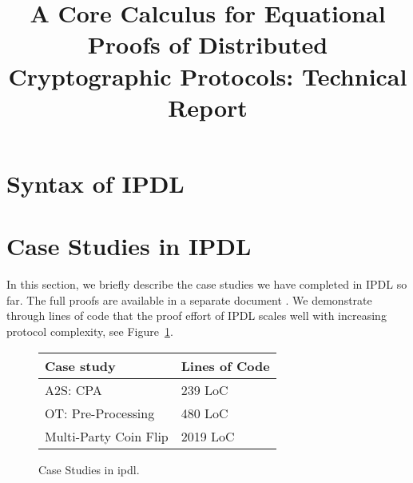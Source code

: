\documentclass[11pt,hidelinks]{article}
\newcommand{\ipdl}{\textsf{IPDL} }
\begin{document}
\title{A Core Calculus for Equational Proofs of Distributed Cryptographic Protocols: Technical Report}

\maketitle

\section{Syntax of \ipdl}


%


\section{Case Studies in \ipdl}
In this section, we briefly describe the case studies we have completed in \ipdl so far. The full proofs are available in a separate document \cite{case_studies}. We demonstrate through lines of code that the proof effort of \ipdl scales well with increasing
protocol complexity, see Figure~\ref{fig:cases}.

\begin{figure}
\begin{center}
\begin{tabular}{|l|l|}
\hline
Case study & Lines of Code \\
\hline
A2S: CPA & 239 LoC \\
\hline
OT: Pre-Processing & 480 LoC \\
\hline
Multi-Party Coin Flip & 2019 LoC \\
\hline
\end{tabular}
\end{center}
\caption{Case Studies in \textsf{ipdl}.}
\label{fig:cases}
\end{figure}
\end{document}
